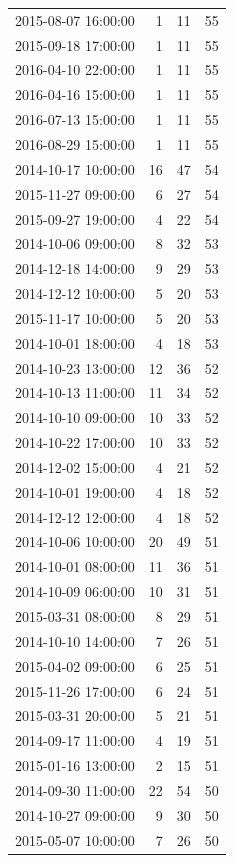 \begin{tabular}{lrrr}
2015-08-07 16:00:00 & 1 & 11 & 55 \\
2015-09-18 17:00:00 & 1 & 11 & 55 \\
2016-04-10 22:00:00 & 1 & 11 & 55 \\
2016-04-16 15:00:00 & 1 & 11 & 55 \\
2016-07-13 15:00:00 & 1 & 11 & 55 \\
2016-08-29 15:00:00 & 1 & 11 & 55 \\
2014-10-17 10:00:00 & 16 & 47 & 54 \\
2015-11-27 09:00:00 & 6 & 27 & 54 \\
2015-09-27 19:00:00 & 4 & 22 & 54 \\
2014-10-06 09:00:00 & 8 & 32 & 53 \\
2014-12-18 14:00:00 & 9 & 29 & 53 \\
2014-12-12 10:00:00 & 5 & 20 & 53 \\
2015-11-17 10:00:00 & 5 & 20 & 53 \\
2014-10-01 18:00:00 & 4 & 18 & 53 \\
2014-10-23 13:00:00 & 12 & 36 & 52 \\
2014-10-13 11:00:00 & 11 & 34 & 52 \\
2014-10-10 09:00:00 & 10 & 33 & 52 \\
2014-10-22 17:00:00 & 10 & 33 & 52 \\
2014-12-02 15:00:00 & 4 & 21 & 52 \\
2014-10-01 19:00:00 & 4 & 18 & 52 \\
2014-12-12 12:00:00 & 4 & 18 & 52 \\
2014-10-06 10:00:00 & 20 & 49 & 51 \\
2014-10-01 08:00:00 & 11 & 36 & 51 \\
2014-10-09 06:00:00 & 10 & 31 & 51 \\
2015-03-31 08:00:00 & 8 & 29 & 51 \\
2014-10-10 14:00:00 & 7 & 26 & 51 \\
2015-04-02 09:00:00 & 6 & 25 & 51 \\
2015-11-26 17:00:00 & 6 & 24 & 51 \\
2015-03-31 20:00:00 & 5 & 21 & 51 \\
2014-09-17 11:00:00 & 4 & 19 & 51 \\
2015-01-16 13:00:00 & 2 & 15 & 51 \\
2014-09-30 11:00:00 & 22 & 54 & 50 \\
2014-10-27 09:00:00 & 9 & 30 & 50 \\
2015-05-07 10:00:00 & 7 & 26 & 50 \\

\end{tabular}
